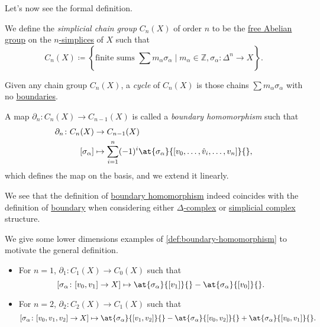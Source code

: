 Let's now see the formal definition.
\begin{definition}\label{def:simplicial-chain-group}
	We define the \emph{simplicial chain group} \(C_{n} (X)\) of order \(n\) to be the \hyperref[def:free-Abelian-group]{free Abelian group} on the \hyperref[def:standard-simplex]{\(n\)-simplices} of \(X\) such
	that
	\[
		C_{n} (X) \coloneqq \left\{\text{finite sums } \sum\limits_{}^{} m_\alpha \sigma _\alpha \mid m_\alpha \in \mathbb{Z} , \sigma _\alpha \colon \Delta ^n \to X\right\}.
	\]
\end{definition}

\begin{definition}[Cycle]\label{def:cycle}
	Given any chain group \(C_{n} (X)\), a \emph{cycle} of \(C_{n} (X)\) is those chains \(\sum m_\alpha \sigma _\alpha\)
	with no \hyperref[def:boundary]{boundaries}.
\end{definition}

\begin{definition}\label{def:boundary-homomorphism}
	A map \(\partial_{n} \colon C_{n} (X)\to C_{n-1}(X) \) is called a \emph{boundary homomorphism} such that
	\[
		\begin{split}
			\partial_{n} \colon C_{n} (X)&\to C_{n-1}(X)\\
			[\sigma _\alpha ]&\mapsto \sum\limits_{i=1}^{n} (-1)^i \at{\sigma _\alpha}{[v_0, \dots , \hat{v}_{i}, \dots , v_{n}]}{},
		\end{split}
	\]
	which defines the map on the basis, and we extend it linearly.
\end{definition}
\begin{remark}
	We see that the definition of \hyperref[def:boundary-homomorphism]{boundary homomorphism} indeed coincides with the definition of
	\hyperref[def:boundary]{boundary} when considering either \hyperref[def:delta-complex]{\(\Delta\)-complex} or
	\hyperref[def:simplicial-complex]{simplicial complex} structure.
\end{remark}

\begin{eg}
	We give some lower dimensions examples of \autoref{def:boundary-homomorphism} to motivate the general definition.
	\begin{itemize}
		\item For \(n=1\), \(\partial_1\colon C_1(X)\to C_0(X)\) such that
		      \[
			      [\sigma _\alpha \colon [v_0, v_1]\to X]\mapsto \at{\sigma _\alpha }{[v_1]}{} - \at{\sigma _\alpha }{[v_0]}{}.
		      \]
		\item For \(n=2\), \(\partial_2\colon C_2(X)\to C_1(X)\) such that
		      \[
			      [\sigma _\alpha \colon [v_0, v_1, v_2]\to X]\mapsto \at{\sigma _\alpha }{[v_1,v_2]}{} - \at{\sigma _\alpha }{[v_0, v_2]}{} + \at{\sigma _\alpha }{[v_0, v_1]}{}.
		      \]
	\end{itemize}
\end{eg}

